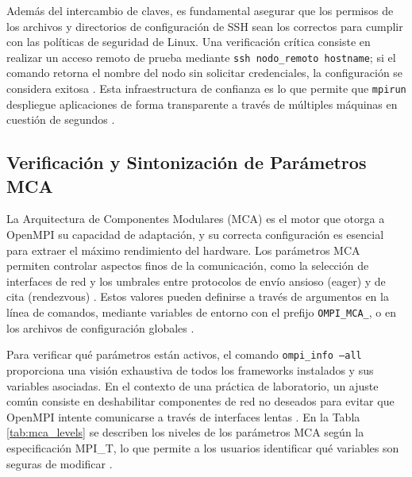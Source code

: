 Además del intercambio de claves, es fundamental asegurar que los permisos de los archivos y directorios de configuración de SSH sean los correctos para cumplir con las políticas de seguridad de Linux. Una verificación crítica consiste en realizar un acceso remoto de prueba mediante \texttt{ssh nodo\_remoto hostname}; si el comando retorna el nombre del nodo sin solicitar credenciales, la configuración se considera exitosa \cite{ref11_cristian_OpenMPI_FAQ}. Esta infraestructura de confianza es lo que permite que \texttt{mpirun} despliegue aplicaciones de forma transparente a través de múltiples máquinas en cuestión de segundos \cite{ref11_cristian_OpenMPI_FAQ}.

\subsection{Verificación y Sintonización de Parámetros MCA}

La Arquitectura de Componentes Modulares (MCA) es el motor que otorga a OpenMPI su capacidad de adaptación, y su correcta configuración es esencial para extraer el máximo rendimiento del hardware. Los parámetros MCA permiten controlar aspectos finos de la comunicación, como la selección de interfaces de red y los umbrales entre protocolos de envío ansioso (eager) y de cita (rendezvous) \cite{ref7_cristian_Squyres2004, ref10_cristian_Ammendola2012}. Estos valores pueden definirse a través de argumentos en la línea de comandos, mediante variables de entorno con el prefijo \texttt{OMPI\_MCA\_}, o en los archivos de configuración globales \cite{ref7_cristian_Squyres2004, ref11_cristian_OpenMPI_FAQ}.

Para verificar qué parámetros están activos, el comando \texttt{ompi\_info --all} proporciona una visión exhaustiva de todos los frameworks instalados y sus variables asociadas. En el contexto de una práctica de laboratorio, un ajuste común consiste en deshabilitar componentes de red no deseados para evitar que OpenMPI intente comunicarse a través de interfaces lentas \cite{ref5_cristian_Graham2006, ref10_cristian_Ammendola2012}. En la Tabla \ref{tab:mca_levels} se describen los niveles de los parámetros MCA según la especificación MPI\_T, lo que permite a los usuarios identificar qué variables son seguras de modificar \cite{ref11_cristian_OpenMPI_FAQ, ref7_cristian_Squyres2004}.

